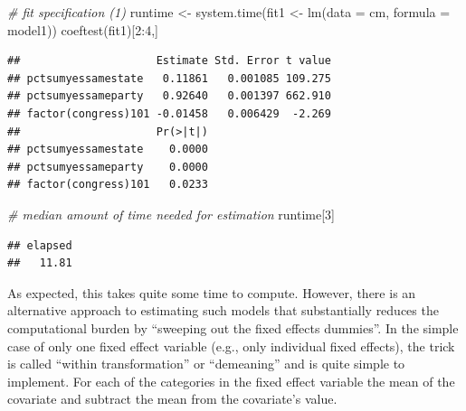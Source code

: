 \documentclass[
  12pt,
]{style/krantz}
\newenvironment{Shaded}{\begin{snugshade}}{\end{snugshade}}
\newcommand{\AttributeTok}[1]{\textcolor[rgb]{0.77,0.63,0.00}{#1}}
\newcommand{\CommentTok}[1]{\textcolor[rgb]{0.56,0.35,0.01}{\textit{#1}}}
\newcommand{\DecValTok}[1]{\textcolor[rgb]{0.00,0.00,0.81}{#1}}
\newcommand{\FunctionTok}[1]{\textcolor[rgb]{0.00,0.00,0.00}{#1}}
\newcommand{\NormalTok}[1]{#1}
\newcommand{\OtherTok}[1]{\textcolor[rgb]{0.56,0.35,0.01}{#1}}
\newcommand{\SpecialCharTok}[1]{\textcolor[rgb]{0.00,0.00,0.00}{#1}}
\begin{document}
\begin{Shaded}
\begin{Highlighting}[]
\CommentTok{\# fit specification (1)}
\NormalTok{runtime }\OtherTok{\textless{}{-}} \FunctionTok{system.time}\NormalTok{(fit1 }\OtherTok{\textless{}{-}} \FunctionTok{lm}\NormalTok{(}\AttributeTok{data =}\NormalTok{ cm, }\AttributeTok{formula =}\NormalTok{ model1))}
\FunctionTok{coeftest}\NormalTok{(fit1)[}\DecValTok{2}\SpecialCharTok{:}\DecValTok{4}\NormalTok{,]}
\end{Highlighting}
\end{Shaded}

\begin{verbatim}
##                     Estimate Std. Error t value
## pctsumyessamestate   0.11861   0.001085 109.275
## pctsumyessameparty   0.92640   0.001397 662.910
## factor(congress)101 -0.01458   0.006429  -2.269
##                     Pr(>|t|)
## pctsumyessamestate    0.0000
## pctsumyessameparty    0.0000
## factor(congress)101   0.0233
\end{verbatim}

\begin{Shaded}
\begin{Highlighting}[]
\CommentTok{\# median amount of time needed for estimation}
\NormalTok{runtime[}\DecValTok{3}\NormalTok{]}
\end{Highlighting}
\end{Shaded}

\begin{verbatim}
## elapsed 
##   11.81
\end{verbatim}

As expected, this takes quite some time to compute. However, there is an alternative approach to estimating such models that substantially reduces the computational burden by ``sweeping out the fixed effects dummies''. In the simple case of only one fixed effect variable (e.g., only individual fixed effects), the trick is called ``within transformation'' or ``demeaning'' and is quite simple to implement. For each of the categories in the fixed effect variable the mean of the covariate and subtract the mean from the covariate's value.
\end{document}
